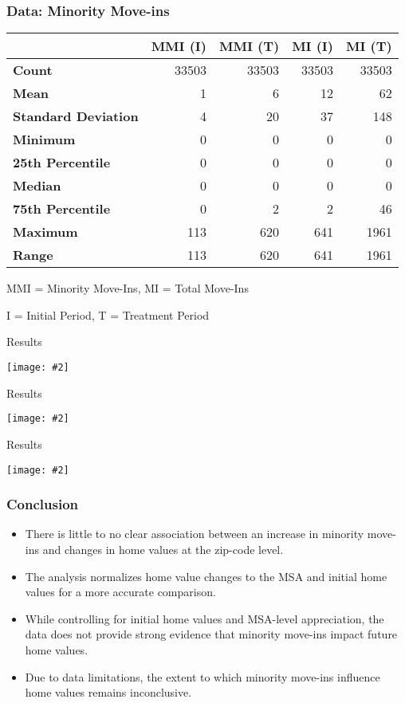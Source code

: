 \documentclass[aspectratio=169]{beamer}
\newcommand {\framedgraphic}[2] {
    \begin{frame}{#1}
        \begin{center}
            \texttt{[image: \#2]}
        \end{center}
    \end{frame}
}
\begin{document}
\begin{frame}
    \frametitle{Data: Minority Move-ins}
    \centering\begin{tabular}{lrrrr}
        \toprule
         & MMI (I) & MMI (T) & MI (I) & MI (T) \\
        \midrule
        \textbf{Count} & 33503 & 33503 & 33503 & 33503 \\
        \textbf{Mean} & 1 & 6 & 12 & 62 \\
        \textbf{Standard Deviation} & 4 & 20 & 37 & 148 \\
        \textbf{Minimum} & 0 & 0 & 0 & 0 \\
        \textbf{25th Percentile} & 0 & 0 & 0 & 0 \\
        \textbf{Median} & 0 & 0 & 0 & 0 \\
        \textbf{75th Percentile} & 0 & 2 & 2 & 46 \\
        \textbf{Maximum} & 113 & 620 & 641 & 1961 \\
        \textbf{Range} & 113 & 620 & 641 & 1961 \\
        \bottomrule
        \end{tabular}

        MMI = Minority Move-Ins, MI = Total Move-Ins
        
        I = Initial Period, T = Treatment Period
\end{frame}
\framedgraphic{Results}{project_files/project_39_0.png}
\framedgraphic{Results}{project_files/project_49_1.png}
\framedgraphic{Results}{project_files/output.png}
\begin{frame}
\frametitle{Conclusion}
\begin{itemize}
    \item There is little to no clear association between an increase in minority move-ins and changes in home values at the zip-code level.
    \item The analysis normalizes home value changes to the MSA and initial home values for a more accurate comparison.
    \item While controlling for initial home values and MSA-level appreciation, the data does not provide strong evidence that minority move-ins impact future home values.
    \item Due to data limitations, the extent to which minority move-ins influence home values remains inconclusive.
\end{itemize}
\end{frame}
\end{document}

